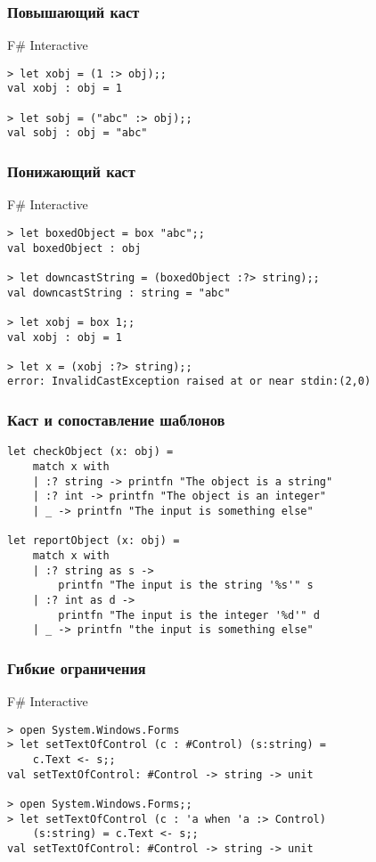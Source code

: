 \documentclass[xetex,mathserif,serif]{beamer}
\begin{document}
	\begin{frame}[fragile]
		\frametitle{Повышающий каст}
		\begin{alertblock}{F\# Interactive}
			\begin{verbatim}
> let xobj = (1 :> obj);;
val xobj : obj = 1

> let sobj = ("abc" :> obj);;
val sobj : obj = "abc"
			\end{verbatim}
		\end{alertblock}
	\end{frame}

	\begin{frame}[fragile]
		\frametitle{Понижающий каст}
		\begin{alertblock}{F\# Interactive}
			\begin{verbatim}
> let boxedObject = box "abc";;
val boxedObject : obj

> let downcastString = (boxedObject :?> string);;
val downcastString : string = "abc"

> let xobj = box 1;;
val xobj : obj = 1

> let x = (xobj :?> string);;
error: InvalidCastException raised at or near stdin:(2,0)
			\end{verbatim}
		\end{alertblock}
	\end{frame}

	\begin{frame}[fragile]
		\frametitle{Каст и сопоставление шаблонов}
		\begin{verbatim}
let checkObject (x: obj) =
    match x with
    | :? string -> printfn "The object is a string"
    | :? int -> printfn "The object is an integer"
    | _ -> printfn "The input is something else"

let reportObject (x: obj) =
    match x with
    | :? string as s -> 
        printfn "The input is the string '%s'" s
    | :? int as d -> 
        printfn "The input is the integer '%d'" d
    | _ -> printfn "the input is something else"
		\end{verbatim}
	\end{frame}

	\begin{frame}[fragile]
		\frametitle{Гибкие ограничения}
		\begin{alertblock}{F\# Interactive}
			\begin{verbatim}
> open System.Windows.Forms
> let setTextOfControl (c : #Control) (s:string) = 
    c.Text <- s;;
val setTextOfControl: #Control -> string -> unit

> open System.Windows.Forms;;
> let setTextOfControl (c : 'a when 'a :> Control) 
    (s:string) = c.Text <- s;;
val setTextOfControl: #Control -> string -> unit
			\end{verbatim}
		\end{alertblock}
	\end{frame}
\end{document}
